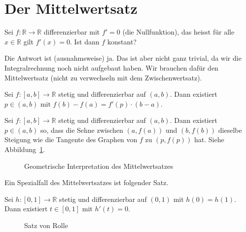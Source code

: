 \documentclass[../main.tex]{subfiles}
\begin{document}
\section{Der Mittelwertsatz}
\begin{question}
  Sei $f \colon \mathbb{R} \to \mathbb{R}$ 
  differenzierbar mit $f' = 0$ (die Nullfunktion),
  das heisst für alle $x \in \mathbb{R}$ gilt
  $f'(x) = 0$. Ist dann $f$ konstant?
\end{question}

Die Antwort ist (ausnahmsweise) ja.
Das ist aber nicht ganz trivial, da wir
die Integralrechnung noch nicht aufgebaut haben.
Wir brauchen dafür den Mittelwertsatz
(nicht zu verwechseln mit dem Zwischenwertsatz).

\begin{meanvalue}
  Sei $f \colon [a, b] \to \mathbb{R}$ 
  stetig und differenzierbar auf $(a, b)$.
  Dann existiert $p \in (a, b)$ mit $f(b) - f(a)
  = f'(p) \cdot (b-a)$.
\end{meanvalue}

\begin{geometric}
  Sei $ f \colon [a, b] \to \mathbb{R}$ stetig
  und differenzierbar auf $(a, b)$.
  Dann existiert $p \in (a, b)$ so, dass
  die Sehne zwischen $(a, f(a))$ und
  $(b, f(b))$ dieselbe Steigung
  wie die Tangente des Graphen von $f$ zu $
  (p, f(p))$ hat. Siehe Abbildung~\ref{fig:meanvalue}.
\end{geometric}

\begin{figure}[htb]
  \centering
  
  \caption{Geometrische Interpretation
  des Mittelwertsatzes}%
  \label{fig:meanvalue}
\end{figure}

Ein Spezialfall des Mittelwertsatzes ist folgender Satz.

\begin{rolle}
  Sei $h \colon [0, 1] \to \mathbb{R}$ stetig
  und differenzierbar auf $(0, 1)$ 
  mit $h(0) = h(1)$.
  Dann existiert $t \in [0, 1]$ 
  mit $h'(t) = 0$.
\end{rolle}

\begin{figure}[htb]
  \centering
  
  \caption{Satz von Rolle}%
  \label{fig:rolle}
\end{figure}
\end{document}
